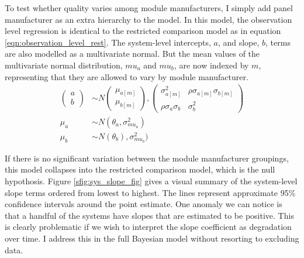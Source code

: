 \documentclass[12pt]{article}
\begin{document}
To test whether quality varies among module manufacturers, I simply add panel manufacturer as an extra hierarchy to the model. In this model, the observation level regression is identical to the restricted comparison model as in equation \ref{eqn:observation_level_rest}. The system-level intercepts, $a$, and slope, $b$, terms are also modelled as a multivariate normal. But the mean values of the multivariate normal distribution, $mu_a$ and $mu_b$, are now indexed by $m$, representing that they are allowed to vary by module manufacturer.
\begin{align}
\begin{pmatrix}
  a\\
  b
\end{pmatrix}
&\sim N
\begin{pmatrix}
  \mu_{a[m]}\\
  \mu_{b[m]}
\end{pmatrix},
\begin{pmatrix}
  \sigma_{a[m]}^2 & \rho \sigma_{a[m]} \sigma_{b[m]} \\
  \rho \sigma_a \sigma_b & \sigma_b^2
\end{pmatrix} \\
\mu_{a} &\sim N(\theta_a, \sigma_{mu_a}^2) \\
\mu_{b} & \sim N(\theta_b), \sigma_{mu_b}^2)
\end{align}

If there is no significant variation between the module manufacturer groupings, this model collapses into the restricted comparison model, which is the null hypothosis. Figure \ref{sfig:sys_slope_fig} gives a visual summary of the system-level slope terms ordered from lowest to highest. The lines represent approximate 95\% confidence intervals around the point estimate. One anomaly we can notice is that a handful of the systems have slopes that are estimated to be positive. This is clearly problematic if we wish to interpret the slope coefficient as degradation over time. I address this in the full Bayesian model without resorting to excluding data.
\end{document}
